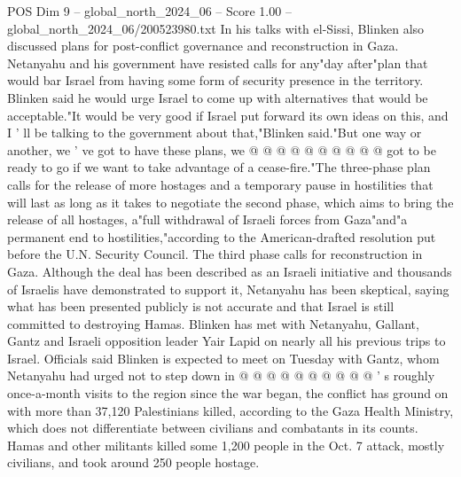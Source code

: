 \begin{textsample}{POS Dim 9 – global\_north\_2024\_06 – Score 1.00 – global\_north\_2024\_06/200523980.txt}
In his talks with el-Sissi, Blinken also discussed plans for post-conflict governance and reconstruction in Gaza.
Netanyahu and his government have resisted calls for any"day after"plan that would bar Israel from having some form of security presence in the territory.
Blinken said he would urge Israel to come up with alternatives that would be acceptable."It would be very good if Israel put forward its own ideas on this, and I ' ll be talking to the government about that,"Blinken said."But one way or another, we ' ve got to have these plans, we @ @ @ @ @ @ @ @ @ @ got to be ready to go if we want to take advantage of a cease-fire."The three-phase plan calls for the release of more hostages and a temporary pause in hostilities that will last as long as it takes to negotiate the second phase, which aims to bring the release of all hostages, a"full withdrawal of Israeli forces from Gaza"and"a permanent end to hostilities,"according to the American-drafted resolution put before the U.N.
Security Council.
The third phase calls for reconstruction in Gaza.
Although the deal has been described as an Israeli initiative and thousands of Israelis have demonstrated to support it, Netanyahu has been skeptical, saying what has been presented publicly is not accurate and that Israel is still committed to destroying Hamas.
Blinken has met with Netanyahu, Gallant, Gantz and Israeli opposition leader Yair Lapid on nearly all his previous trips to Israel.
Officials said Blinken is expected to meet on Tuesday with Gantz, whom Netanyahu had urged not to step down in @ @ @ @ @ @ @ @ @ @ ' s roughly once-a-month visits to the region since the war began, the conflict has ground on with more than 37,120 Palestinians killed, according to the Gaza Health Ministry, which does not differentiate between civilians and combatants in its counts.
Hamas and other militants killed some 1,200 people in the Oct. 7 attack, mostly civilians, and took around 250 people hostage.

\end{textsample}
